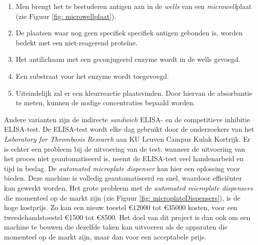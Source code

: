 \documentclass[a4paper,twoside,kulak]{kulakreport} %
\begin{document}
\begin{enumerate}
	\item Men brengt het te bestuderen antigen aan in de \textit{wells} van een \textit{microwell}plaat (zie Figuur \ref{fig: microwellplaat}).
	\item De plaatsen waar nog geen specifiek specifiek antigen gebonden is, worden bedekt met een niet-reagerend proteïne.
	\item Het antilichaam met een geconjugeerd enzyme wordt in de wells gevoegd.
	\item Een substraat voor het enzyme wordt toegevoegd. 
	\item Uiteindelijk zal er een kleurreactie plaatsvinden. Door hiervan de absorbantie te meten, kunnen de nodige concentraties bepaald worden. 
\end{enumerate}
Andere varianten zijn de indirecte \textit{sandwich} ELISA- en de competitieve inhibitie ELISA-test\cite{soortenELISA1}\cite{soortenELISA2}\cite{soortenELISA3}.
De ELISA-test wordt elke dag gebruikt door de onderzoekers van het \textit{Laboratory for Thrombosis Research} aan KU Leuven Campus Kulak Kortrijk. Er is echter een probleem bij de uitvoering van de test: wanneer de uitvoering van het proces niet geautomatiseerd is, neemt de ELISA-test veel handenarbeid en tijd in beslag. De \textit{automated microplate dispenser} kan hier een oplossing voor bieden. Deze machine is volledig geautomatiseerd en snel, waardoor efficiënter kan gewerkt worden. 
\newline
Het grote probleem met de \textit{automated microplate dispensers} die momenteel op de markt zijn (zie Figuur \ref{fig: microplateDispensers}), is de hoge kostprijs. Zo kan een nieuw toestel  \euro $12000$ tot \euro $35000$\cite{BioSPX} kosten, voor een tweedehandstoestel \euro 1500 tot \euro 8500\cite{LabX}. Het doel van dit project is dan ook om een machine te bouwen die dezelfde taken kan uitvoeren als de apparaten die momenteel op de markt zijn, maar dan voor een acceptabele prijs.
\end{document}
